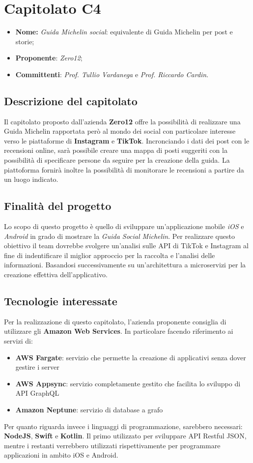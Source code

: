 \section{Capitolato C4}
		\begin{itemize}
			\item \textbf{Nome:} \textit{Guida Michelin social}: equivalente di Guida Michelin per post e storie;
			\item \textbf{Proponente}: \textit{Zero12};
			\item \textbf{Committenti}: \textit{Prof. Tullio Vardanega} e \textit{Prof. Riccardo Cardin}.
		\end{itemize}
		\subsection{Descrizione del capitolato}
		Il capitolato proposto dall'azienda \textbf{Zero12} offre la possibilità di realizzare una Guida Michelin rapportata però al mondo dei social con particolare interesse verso le piattaforme di \textbf{Instagram} e \textbf{TikTok}. Incronciando i dati dei post con le recensioni online, sarà possibile creare una mappa di posti suggeriti con la possibilità di specificare persone da seguire per la creazione della guida. La piattoforma fornirà inoltre la possibilità di monitorare le recensioni a partire da un luogo indicato. 
		\subsection{Finalità del progetto}
		Lo scopo di questo progetto è quello di sviluppare un'applicazione mobile \textit{iOS} e \textit{Android} in grado di mostrare la \textit{Guida Social Michelin}. Per realizzare questo obiettivo il team dovrebbe svolgere un'analisi sulle API di TikTok e Instagram al fine di indentificare il miglior approccio per la raccolta e l'analisi delle informazioni. Basandosi successivamente su un'architettura a microservizi per la creazione effettiva dell'applicativo. 
		\subsection{Tecnologie interessate}
		Per la realizzazione di questo capitolato, l'azienda proponente consiglia di utilizzare gli \textbf{Amazon Web Services}. In particolare facendo riferimento ai servizi di:
			\begin{itemize}
				\item \textbf{AWS Fargate}: servizio che permette la creazione di applicativi senza dover gestire i server
				\item \textbf{AWS Appsync}: servizio completamente gestito che facilita lo sviluppo di API GraphQL
				\item \textbf{Amazon Neptune}: servizio di database a grafo
			\end{itemize}
		Per quanto riguarda invece i linguaggi di programmazione, sarebbero necessari: \textbf{NodeJS}, \textbf{Swift} e \textbf{Kotlin}. Il primo utilizzato per sviluppare API Restful JSON, mentre i restanti verrebbero utilizzati rispettivamente per programmare applicazioni in ambito iOS e Android. 
